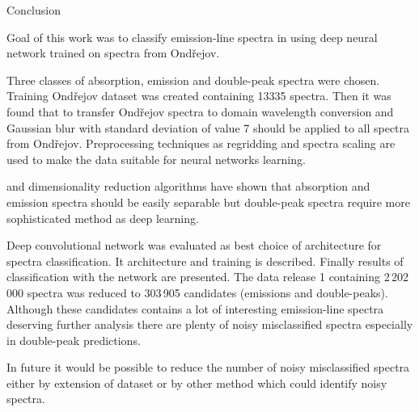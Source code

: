 \chap Conclusion

Goal of this work was to classify emission-line spectra in 
using deep neural network trained on spectra from Ondřejov.

Three classes of absorption, emission and double-peak spectra were chosen.
Training Ondřejov dataset was created containing 13335 spectra.
Then it was found that to transfer Ondřejov spectra to
 domain wavelength conversion
and Gaussian blur with standard deviation of value 7
should be applied to all spectra from Ondřejov.
Preprocessing techniques as regridding and spectra scaling are used
to make the data suitable for neural networks learning.

 and  dimensionality reduction algorithms have shown
that absorption and emission spectra should be easily separable
but double-peak spectra require more sophisticated method as deep learning.

Deep convolutional network was evaluated as best choice of architecture for
spectra classification. It architecture and training is described.
Finally results of classification with the network are presented.
The  data release 1 containing 2\,202\,000 spectra was reduced to
303\,905 candidates (emissions and double-peaks).
Although these candidates contains a lot of interesting emission-line
spectra deserving further analysis
there are plenty of noisy misclassified spectra especially in double-peak
predictions.

In future it would be possible to reduce the number of noisy misclassified
spectra either by extension of dataset
or by other method which could identify noisy spectra.
